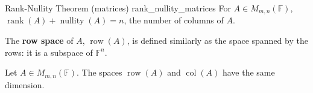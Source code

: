 \begin{theorem}{Rank-Nullity Theorem (matrices) \cite{math2601_notes}}{rank_nullity_matrices}
	For $A \in M_{m,n}(\mathbb{F})$, $\operatorname{rank}(A) + \operatorname{nullity}(A) = n$, the number of columns of $A$.
\end{theorem}

The \textbf{row space} of $A$, $\operatorname{row}(A)$, is defined similarly as the space spanned by the rows: it is a subspace of $\mathbb{F}^n$.

\begin{theorem}{\cite{math2601_notes}}{}
	Let $A \in M_{m,n}(\mathbb{F})$. The spaces $\operatorname{row}(A)$ and $\operatorname{col}(A)$ have the same dimension.
\end{theorem}